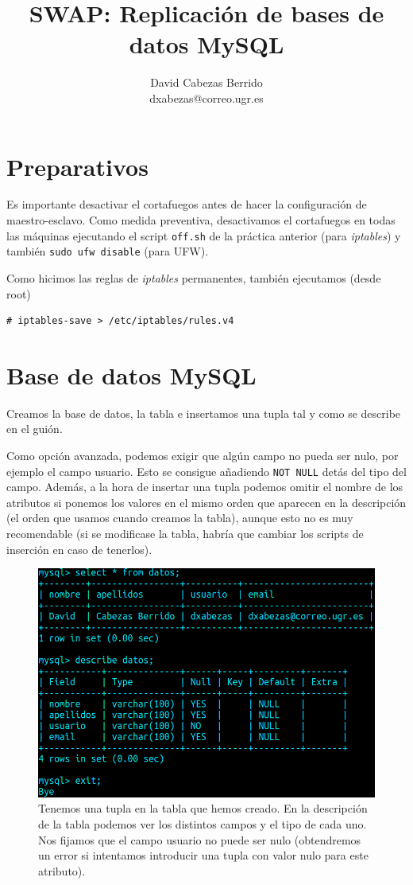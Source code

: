 \documentclass{article}
\title{\Huge SWAP: Replicación de bases de datos MySQL\vspace{10mm}}
\author{\huge David Cabezas Berrido \vspace{10mm} \\ 
  \huge dxabezas@correo.ugr.es \vspace{10mm}}
\begin{document}
\maketitle
\tableofcontents
\newpage

\section{Preparativos}

Es importante desactivar el cortafuegos antes de hacer la configuración de maestro-esclavo. Como medida preventiva, desactivamos el 
cortafuegos en
todas las máquinas ejecutando el script \texttt{off.sh} de la práctica anterior (para \emph{iptables}) y también \verb|sudo ufw disable| (para UFW).

Como hicimos las reglas de \emph{iptables} permanentes, también ejecutamos (desde root)
\begin{Verbatim}
# iptables-save > /etc/iptables/rules.v4
\end{Verbatim}

\section{Base de datos MySQL}

Creamos la base de datos, la tabla e insertamos una tupla tal y como se describe en el guión.

Como opción avanzada, podemos exigir que algún campo no pueda ser nulo, por ejemplo el campo usuario. Esto se consigue
añadiendo \texttt{NOT NULL} detás del tipo del campo. Además, a la hora de insertar una tupla podemos omitir el nombre de los atributos si
 ponemos los valores en el mismo orden que aparecen en la descripción (el orden que usamos cuando creamos la tabla), aunque esto
 no es muy recomendable (si se modificase la tabla, habría que cambiar los scripts de inserción en caso de tenerlos).
 
\begin{figure}[H]
	\centering
	\includegraphics[width=120mm]{imgs/mydb}
	\caption{Tenemos una tupla en la tabla que hemos creado. En la descripción de la tabla podemos ver los distintos
	campos y el tipo de cada uno. Nos fijamos que el campo usuario no puede ser nulo (obtendremos un error si intentamos introducir
	una tupla con valor nulo para este atributo).}
	\label{fig:mydb}
\end{figure}
\end{document}
